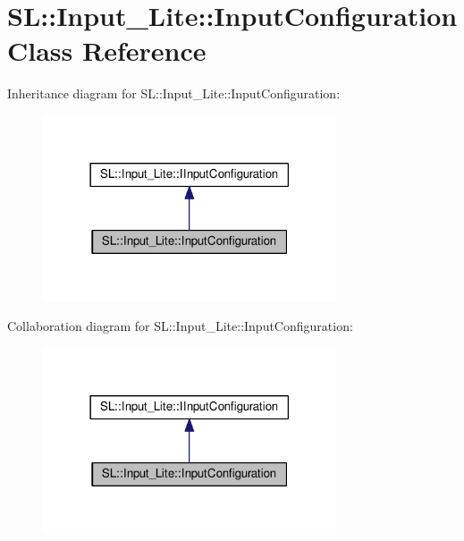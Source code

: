 \hypertarget{class_s_l_1_1_input___lite_1_1_input_configuration}{}\section{SL\+:\+:Input\+\_\+\+Lite\+:\+:Input\+Configuration Class Reference}
\label{class_s_l_1_1_input___lite_1_1_input_configuration}


Inheritance diagram for SL\+:\+:Input\+\_\+\+Lite\+:\+:Input\+Configuration\+:\nopagebreak
\begin{figure}[H]
\begin{center}
\leavevmode
\includegraphics[width=246pt]{class_s_l_1_1_input___lite_1_1_input_configuration__inherit__graph}
\end{center}
\end{figure}


Collaboration diagram for SL\+:\+:Input\+\_\+\+Lite\+:\+:Input\+Configuration\+:\nopagebreak
\begin{figure}[H]
\begin{center}
\leavevmode
\includegraphics[width=246pt]{class_s_l_1_1_input___lite_1_1_input_configuration__coll__graph}
\end{center}
\end{figure}
